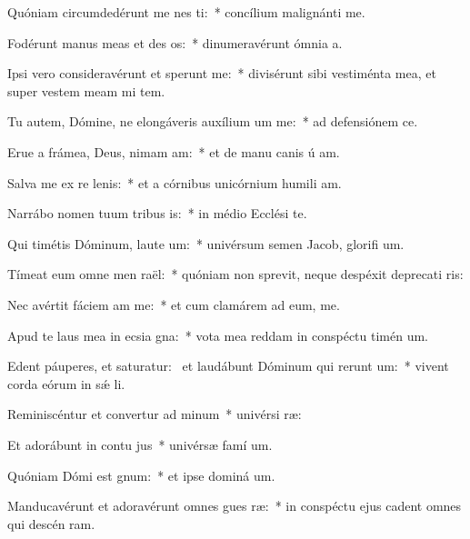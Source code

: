 \item Quóniam circumdedérunt me nes ti:~* concílium malignánti  me.
\item Fodérunt manus meas et des os:~* dinumeravérunt ómnia  a.
\item Ipsi vero consideravérunt et sperunt me:~* divisérunt sibi vestiménta mea, et super vestem meam mi tem.
\item Tu autem, Dómine, ne elongáveris auxílium um  me:~* ad defensiónem  ce.
\item Erue a frámea, Deus, nimam am:~* et de manu canis ú am.
\item Salva me ex re lenis:~* et a córnibus unicórnium humili am.
\item Narrábo nomen tuum tribus is:~* in médio Ecclési  te.
\item Qui timétis Dóminum, laute um:~* univérsum semen Jacob, glorifi um.
\item Tímeat eum omne men raël:~* quóniam non sprevit, neque despéxit deprecati ris:
\item Nec avértit fáciem am  me:~* et cum clamárem ad eum,  me.
\item Apud te laus mea in ecsia gna:~* vota mea reddam in conspéctu timén um.
\item Edent páuperes, et saturatur:~\pscross{} et laudábunt Dóminum qui rerunt um:~* vivent corda eórum in sǽ li.
\item Reminiscéntur et convertur ad minum~* univérsi  ræ:
\item Et adorábunt in contu jus~* univérsæ famí um.
\item Quóniam Dómi est gnum:~* et ipse dominá um.
\item Manducavérunt et adoravérunt omnes gues ræ:~* in conspéctu ejus cadent omnes qui descén  ram.
